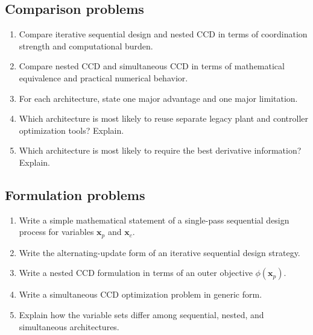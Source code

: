 \documentclass[11pt]{article}
\newcommand{\vect}[1]{\boldsymbol{#1}}
\newcommand{\xp}{\vect{x}_p}
\newcommand{\xc}{\vect{x}_c}
\begin{document}
\subsection*{Comparison problems}
\begin{enumerate}[leftmargin=1.5em,label=\textbf{P\arabic*.},resume]
  \item Compare iterative sequential design and nested CCD in terms of coordination strength and computational burden.
  \item Compare nested CCD and simultaneous CCD in terms of mathematical equivalence and practical numerical behavior.
  \item For each architecture, state one major advantage and one major limitation.
  \item Which architecture is most likely to reuse separate legacy plant and controller optimization tools? Explain.
  \item Which architecture is most likely to require the best derivative information? Explain.
\end{enumerate}

\subsection*{Formulation problems}
\begin{enumerate}[leftmargin=1.5em,label=\textbf{P\arabic*.},resume]
  \item Write a simple mathematical statement of a single-pass sequential design process for variables $\xp$ and $\xc$.
  \item Write the alternating-update form of an iterative sequential design strategy.
  \item Write a nested CCD formulation in terms of an outer objective $\phi(\xp)$.
  \item Write a simultaneous CCD optimization problem in generic form.
  \item Explain how the variable sets differ among sequential, nested, and simultaneous architectures.
\end{enumerate}
\end{document}
